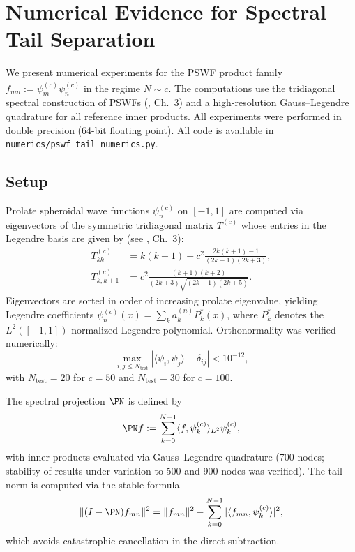 
\section{Numerical Evidence for Spectral Tail Separation}
\label{sec:numerics}

We present numerical experiments for the PSWF product family
$f_{mn} := \psi_m^{(c)}\overline{\psi_n^{(c)}}$
in the regime $N \sim c$.
The computations use the tridiagonal spectral construction
of PSWFs (\cite{OsipovRokhlinXiao}, Ch.~3)
and a high-resolution Gauss--Legendre quadrature
for all reference inner products.
All experiments were performed in double precision (64-bit floating point).
All code is available in \texttt{numerics/pswf\_tail\_numerics.py}.

\subsection{Setup}
\label{sec:numerics-setup}

Prolate spheroidal wave functions $\psi_n^{(c)}$ on $[-1,1]$
are computed via eigenvectors of the
symmetric tridiagonal matrix $T^{(c)}$
whose entries in the Legendre basis are given by
(see \cite{OsipovRokhlinXiao}, Ch.~3):
\begin{align*}
  T^{(c)}_{kk} &= k(k+1)
    + c^2 \frac{2k(k+1)-1}{(2k-1)(2k+3)}, \\
  T^{(c)}_{k,k+1} &= c^2
    \frac{(k+1)(k+2)}{(2k+3)\sqrt{(2k+1)(2k+5)}}.
\end{align*}
Eigenvectors are sorted in order of increasing prolate eigenvalue,
yielding Legendre coefficients
$\psi_n^{(c)}(x) = \sum_k a_k^{(n)} P_k^*(x)$,
where $P_k^*$ denotes the $L^2([-1,1])$-normalized Legendre polynomial.
Orthonormality was verified numerically:
\[
  \max_{\,i,j \le N_{\mathrm{test}}}|\langle\psi_i,\psi_j\rangle - \delta_{ij}|
  < 10^{-12},
\]
with $N_{\mathrm{test}} = 20$ for $c=50$ and $N_{\mathrm{test}} = 30$ for $c=100$.

The spectral projection $\PN$ is defined by
\[
  \PN f := \sum_{k=0}^{N-1} \langle f, \psi_k^{(c)} \rangle_{L^2}
  \psi_k^{(c)},
\]
with inner products evaluated via Gauss--Legendre quadrature
(700 nodes; stability of results under variation to 500 and 900 nodes
was verified).
The tail norm is computed via the stable formula
\[
  \|(I-\PN)f_{mn}\|^2
  = \|f_{mn}\|^2
  - \sum_{k=0}^{N-1}
  |\langle f_{mn}, \psi_k^{(c)} \rangle|^2,
\]
which avoids catastrophic cancellation in the direct subtraction.

